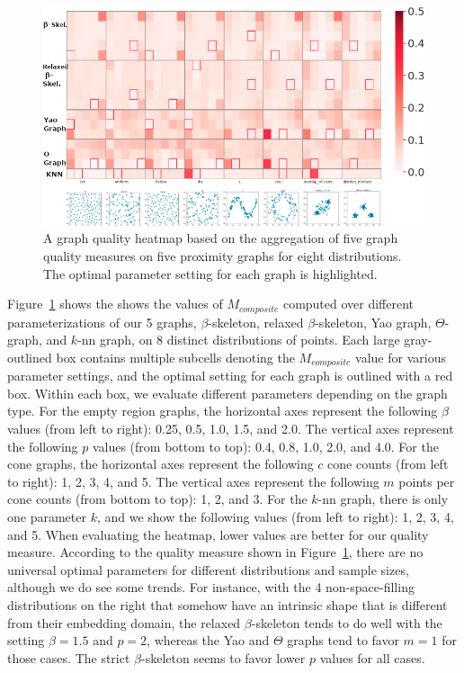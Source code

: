 \begin{figure}[htbp]
  \includegraphics[width=\linewidth]{figs/chap7/Combined5graphs.png}
  \caption[Heatmaps for identifying optimal graph quality]{A graph quality heatmap based on the aggregation of five graph quality measures on five proximity graphs for eight distributions.
  The optimal parameter setting for each graph is highlighted.}
  \label{fig:teaser}
\end{figure}

Figure~\ref{fig:teaser} shows the shows the values of $M_{composite}$ computed over different parameterizations of our 5 graphs, $\beta$-skeleton, relaxed $\beta$-skeleton, Yao graph, $\Theta$-graph, and $k$-nn graph, on 8 distinct distributions of points.
%
Each large gray-outlined box contains multiple subcells denoting the $M_{composite}$ value for various parameter settings, and the optimal setting for each graph is outlined with a red box.
%
Within each box, we evaluate different parameters depending on the graph type.
%
For the empty region graphs, the horizontal axes represent the following $\beta$ values (from left to right): 0.25, 0.5, 1.0, 1.5, and 2.0.
%
The vertical axes represent the following $p$ values (from bottom to top): 0.4, 0.8, 1.0, 2.0, and 4.0.
%
For the cone graphs, the horizontal axes represent the following $c$ cone counts (from left to right): 1, 2, 3, 4, and 5.
%
The vertical axes represent the following $m$ points per cone counts (from bottom to top): 1, 2, and 3.
%
For the $k$-nn graph, there is only one parameter $k$, and we show the following values (from left to right): 1, 2, 3, 4, and 5.
%
When evaluating the heatmap, lower values are better for our quality measure.
%
According to the quality measure shown in Figure~\ref{fig:teaser}, there are no universal optimal parameters for different distributions and sample sizes, although we do see some trends.
%
For instance, with the 4 non-space-filling distributions on the right that somehow have an intrinsic shape that is different from their embedding domain, the relaxed $\beta$-skeleton tends to do well with the setting $\beta=1.5$ and $p=2$, whereas the Yao and $\Theta$ graphs tend to favor $m=1$ for those cases.
%
The strict $\beta$-skeleton seems to favor lower $p$ values for all cases.

